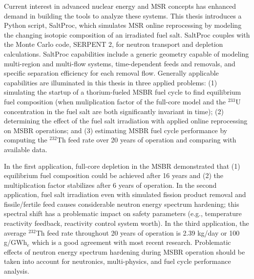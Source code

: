 Current interest in advanced nuclear energy and \gls{MSR} concepts has enhanced demand in building the tools to analyze these systems. This thesis introduces a Python script, SaltProc, which simulates \gls{MSR} online reprocessing by modeling the changing isotopic composition of an irradiated fuel salt. SaltProc couples with the Monte Carlo code, SERPENT 2, for neutron transport and depletion calculations. SaltProc capabilities include a generic geometry capable of modeling multi-region and multi-flow systems, time-dependent feeds and removals, and specific separation efficiency for each removal flow. Generally applicable  capabilities are illuminated in this thesis in three applied problems: (1) simulating the startup of a thorium-fueled \gls{MSBR} fuel cycle to find equilibrium fuel composition (when muliplication factor of the full-core model and the $^{233}$U concentration in the fuel salt are both significantly invariant in time); (2) determining the effect of the fuel salt irradiation with applied online reprocessing on \gls{MSBR} operations; and (3) estimating \gls{MSBR} fuel cycle performance by computing the $^{232}$Th feed rate over 20 years of operation and comparing with available data.

In the first application, full-core depletion in the \gls{MSBR} demonstrated that (1) equilibrium fuel composition could be achieved after 16 years and (2) the multiplication factor stabilizes after 6 years of operation. In the second application, fuel salt irradiation even with simulated fission product removal and fissile/fertile feed causes considerable neutron energy spectrum hardening; this spectral shift has a problematic impact on safety parameters (e.g., temperature reactivity feedback, reactivity control system worth). In the third application, the average $^{232}$Th feed rate throughout 20 years of operation is 2.39 kg/day or 100 g/GWh$_e$ which is a good agreement with most recent research. Problematic effects of neutron energy spectrum hardening during \gls{MSBR} operation should be taken into account for neutronics, multi-physics, and fuel cycle performance analysis.